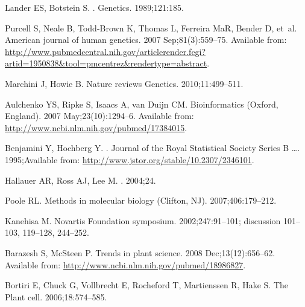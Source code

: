 \documentclass[10pt,letterpaper]{article}
\begin{document}
\begin{thebibliography}{10}
Lander ES, Botstein S.
.
\newblock Genetics. 1989;121:185.

Purcell S, Neale B, Todd-Brown K, Thomas L, Ferreira MaR, Bender D, et~al.
\newblock American journal of human genetics. 2007 Sep;81(3):559--75.
\newblock Available from:
  \url{http://www.pubmedcentral.nih.gov/articlerender.fcgi?artid=1950838\&tool=pmcentrez\&rendertype=abstract}.

Marchini J, Howie B.
\newblock Nature reviews Genetics. 2010;11:499--511.

Aulchenko YS, Ripke S, Isaacs A, van Duijn CM.
\newblock Bioinformatics (Oxford, England). 2007 May;23(10):1294--6.
\newblock Available from: \url{http://www.ncbi.nlm.nih.gov/pubmed/17384015}.

Benjamini Y, Hochberg Y.
.
\newblock Journal of the Royal Statistical Society Series B \ldots.
  1995;Available from: \url{http://www.jstor.org/stable/10.2307/2346101}.

Hallauer AR, Ross AJ, Lee M.
. 2004;24.

Poole RL.
\newblock Methods in molecular biology (Clifton, NJ). 2007;406:179--212.

Kanehisa M.
\newblock Novartis Foundation symposium. 2002;247:91--101; discussion 101--103,
  119--128, 244--252.

Barazesh S, McSteen P.
\newblock Trends in plant science. 2008 Dec;13(12):656--62.
\newblock Available from: \url{http://www.ncbi.nlm.nih.gov/pubmed/18986827}.

Bortiri E, Chuck G, Vollbrecht E, Rocheford T, Martienssen R, Hake S.
\newblock The Plant cell. 2006;18:574--585.


\end{thebibliography}
\end{document}
